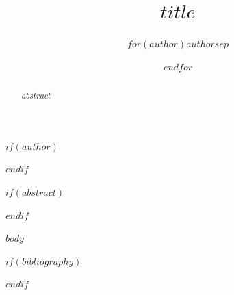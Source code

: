 \documentclass[journal]{IEEEtran}
\begin{document}
\title{$title$}
$if(author)$
\author{$for(author)$$author$$sep$ \and $endfor$}
$endif$
\maketitle

$if(abstract)$
\begin{abstract}
$abstract$
\end{abstract}
$endif$

$body$

$if(bibliography)$


$endif$
\end{document}
